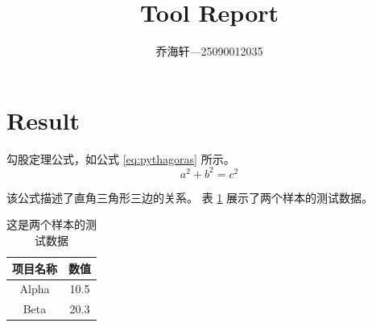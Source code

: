 \documentclass{article}
\begin{document}
\title{Tool Report}
\author{乔海轩—25090012035}
\maketitle
\section{Result}
勾股定理公式，如公式 \eqref{eq:pythagoras} 所示。
\begin{equation}
    a^2 + b^2 = c^2
    \label{eq:pythagoras}
\end{equation}

该公式描述了直角三角形三边的关系。
表 \ref{tab:scores} 展示了两个样本的测试数据。
\begin{table}[h]
    \centering
    \begin{tabular}{|c|c|}
        \hline
        项目名称 & 数值 \\
        \hline
        Alpha   & 10.5 \\
        Beta    & 20.3 \\
        \hline
    \end{tabular}
    \caption{这是两个样本的测试数据}
    \label{tab:scores}
\end{table}
\end{document}
